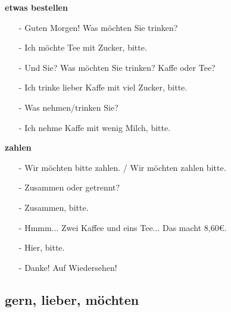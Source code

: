             \begin{multicols}{2}
                \textbf{etwas bestellen}
                \begin{itemize}[topsep=0pt,itemsep=4pt,parsep=0pt]
                    \item[-]  Guten Morgen! Was möchten Sie trinken?
                    \item[-]  Ich möchte Tee mit Zucker, bitte.
                    \item[-]  Und Sie? Was möchten Sie trinken? Kaffe oder Tee?
                    \item[-]  Ich trinke lieber Kaffe mit viel Zucker, bitte.
                    \item[-]  Was nehmen/trinken Sie?
                    \item[-]  Ich nehme Kaffe mit wenig Milch, bitte.
                \end{itemize}
            \vfill\null
            \columnbreak
                \textbf{zahlen}
                \begin{itemize}[topsep=0pt,itemsep=4pt,parsep=0pt]
                    \item[-]  Wir möchten bitte zahlen. / Wir möchten zahlen bitte. 
                    \item[-]  Zusammen oder getrennt?
                    \item[-]  Zusammen, bitte.
                    \item[-]  Hmmm... Zwei Kaffee und eins Tee... Das macht 8,60\euro.
                    \item[-]  Hier, bitte.
                    \item[-]  Danke! Auf Wiedersehen!
                \end{itemize}
            \vfill\null
            \end{multicols}

        \subsection{gern, lieber, möchten}\label{subsection:deutsch:im_cafe:gern_lieber_mochten}

